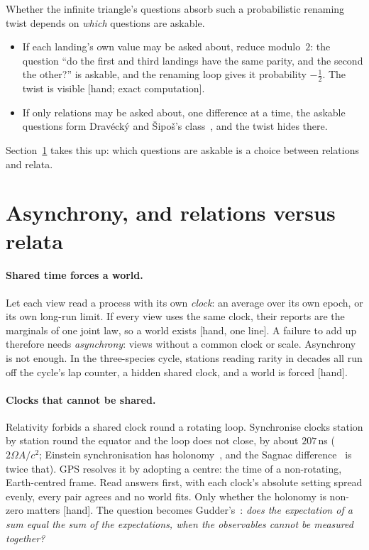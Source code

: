 \documentclass[11pt]{article}
\newcommand{\st}[1]{\textsf{\small[#1]}}
\begin{document}
\medskip
\noindent Whether the infinite triangle's questions absorb such a probabilistic renaming
twist depends on \emph{which} questions are askable.
\begin{itemize}[nosep]
  \item If each landing's own value may be asked about, reduce modulo~$2$: the
    question ``do the first and third landings have the same parity, and the
    second the other?'' is askable, and the renaming loop gives it probability
    $-\tfrac12$. The twist is visible \st{hand; exact computation}.
  \item If only relations may be asked about, one difference at a time, the
    askable questions form Drav\'eck\'y and \v{S}ipo\v{s}'s
    class~\cite{draveckysipos1980}, and the twist hides there.
\end{itemize}
Section~\ref{sec:relata} takes this up: which questions are askable is a choice
between relations and relata.

\section{Asynchrony, and relations versus relata}\label{sec:relata}
\paragraph{Shared time forces a world.} Let each view read a process with its
own \emph{clock}: an average over its own epoch, or its own long-run limit. If
every view uses the same clock, their reports are the marginals of one joint
law, so a world exists \st{hand, one line}. A failure to add up therefore needs
\emph{asynchrony}: views without a common clock or scale. Asynchrony is not
enough. In the three-species cycle, stations reading rarity in decades all run
off the cycle's lap counter, a hidden shared clock, and a world is forced
\st{hand}.

\paragraph{Clocks that cannot be shared.} Relativity forbids a shared clock round
a rotating loop. Synchronise clocks station by station round the equator and the
loop does not close, by about $207$\,ns ($2\Omega A/c^2$; Einstein
synchronisation has holonomy~\cite{minguzzi2005}, and the Sagnac
difference~\cite{rizziruggiero2003} is twice that). GPS resolves it by adopting a
centre: the time of a non-rotating, Earth-centred frame. Read answers first, with
each clock's absolute setting spread evenly, every pair agrees and no world fits.
Only whether the holonomy is non-zero matters \st{hand}. The question becomes
Gudder's~\cite{gudder1969,draveckysipos1980,navaraptak1983,navara1984}:
\emph{does the expectation of a sum equal the sum of the expectations, when the
observables cannot be measured together?}
\end{document}
